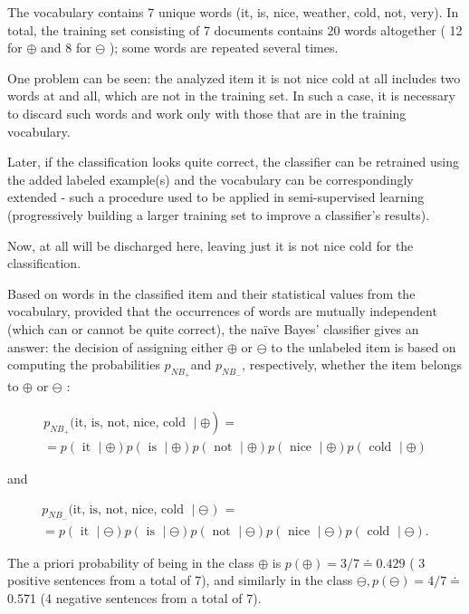 \documentclass[11pt,openany,executivepaper]{book}
\begin{document}
The vocabulary contains 7 unique words (it, is, nice, weather, cold, not, very). In total, the training set consisting of 7 documents contains 20 words altogether ( 12 for $\oplus$ and 8 for $\ominus$ ); some words are repeated several times.

One problem can be seen: the analyzed item it is not nice cold at all includes two words at and all, which are not in the training set. In such a case, it is necessary to discard such words and work only with those that are in the training vocabulary.

Later, if the classification looks quite correct, the classifier can be retrained using the added labeled example(s) and the vocabulary can be correspondingly extended - such a procedure used to be applied in semi-supervised learning (progressively building a larger training set to improve a classifier's results).

Now, at all will be discharged here, leaving just it is not nice cold for the classification.

Based on words in the classified item and their statistical values from the vocabulary, provided that the occurrences of words are mutually independent (which can or cannot be quite correct), the naïve Bayes' classifier gives an answer: the decision of assigning either $\oplus$ or $\ominus$ to the unlabeled item is based on computing the probabilities $p_{N B_{+}}$and $p_{N B_{-}}$, respectively, whether the item belongs to $\oplus$ or $\ominus$ :

$$
\begin{gathered}
\left.p_{N B_{+}} \text {(it, is, not, nice, cold } \mid \oplus\right)= \\
=p(\text { it } \mid \oplus) p(\text { is } \mid \oplus) p(\text { not } \mid \oplus) p(\text { nice } \mid \oplus) p(\text { cold } \mid \oplus)
\end{gathered}
$$

and

$$
\begin{gathered}
p_{N B_{-}} \text {(it, is, not, nice, cold } \mid \ominus \text { ) }= \\
=p(\text { it } \mid \ominus) p(\text { is } \mid \ominus) p(\text { not } \mid \ominus) p(\text { nice } \mid \ominus) p(\text { cold } \mid \ominus) .
\end{gathered}
$$

The a priori probability of being in the class $\oplus$ is $p(\oplus)=3 / 7 \doteq 0.429$ ( 3 positive sentences from a total of 7), and similarly in the class $\ominus, p(\ominus)=4 / 7 \doteq$ 0.571 (4 negative sentences from a total of 7).
\end{document}
